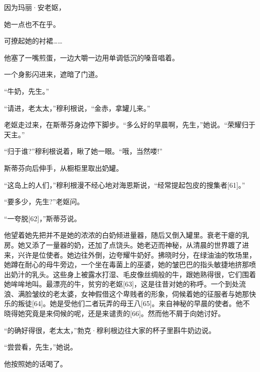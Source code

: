 \documentclass{article}
\begin{document}
因为玛丽·安老妪，



她一点也不在乎。



可撩起她的衬裙……



他塞了一嘴煎蛋，一边大嚼一边用单调低沉的嗓音唱着。



一个身影闪进来，遮暗了门道。



“牛奶，先生。”



“请进，老太太，”穆利根说，“金赤，拿罐儿来。”



老妪走过来，在斯蒂芬身边停下脚步。“多么好的早晨啊，先生，”她说。“荣耀归于天主。”



“归于谁?”穆利根说着，瞅了她一眼。“哦，当然喽!”



斯蒂芬向后伸手，从橱柜里取出奶罐。



“这岛上的人们，”穆利根漫不经心地对海恩斯说，“经常提起包皮的搜集者[61]。”



“要多少，先生?”老妪问。



“一夸脱[62]，”斯蒂芬说。



他望着她先把并不是她的浓浓的白奶倾进量器，随后又倒入罐里。衰老干瘪的乳房。她又添了一量器的奶，还加了点饶头。她老迈而神秘，从清晨的世界踱了进来，兴许是位使者。她边往外倒，边夸耀牛奶好。拂晓时分，在绿油油的牧场里，她蹲在耐心的母牛旁边，一个坐在毒菌上的巫婆，她的皱巴巴的指头敏捷地挤那喷出奶汁的乳头。这些身上被露水打湿、毛皮像丝绸般的牛，跟她熟得很，它们围着她哞哞地叫。最漂亮的牛，贫穷的老妪[63]，这是往昔对她的称呼。一个到处流浪、满脸皱纹的老太婆，女神假借这个卑贱者的形象，伺候着她的征服者与她那快乐的叛徒[64]。她是受他们二者玩弄的母王八[65]。来自神秘的早晨的使者。他不晓得她究竟是来伺候的呢，还是来谴责的[66]。然而他不屑于向她讨好。



“的确好得很，老太太，”勃克·穆利根边往大家的杯子里斟牛奶边说。



“尝尝看，先生，”她说。



他按照她的话喝了。
\end{document}
